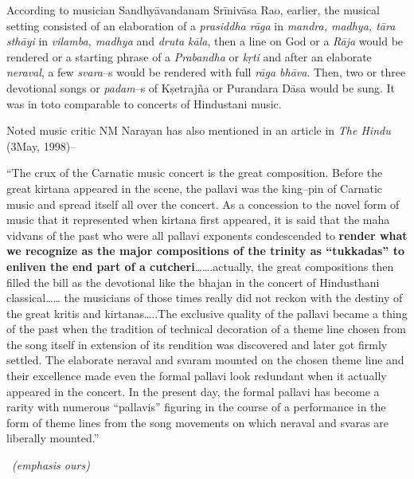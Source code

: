 According to musician Sandhyāvandanam Srīnivāsa Rao, earlier, the musical setting consisted of an elaboration of a \textit{prasiddha rāga} in \textit{mandra, madhya, tāra sthāyi} in \textit{vilamba, madhya} and \textit{druta kāla}, then a line on God or a \textit{Rāja} would be rendered or a starting phrase of a \textit{Prabandha} or \textit{kṛti} and after an elaborate \textit{neraval}, a few \textit{svara}–s would be rendered with full \textit{rāga bhāva}. Then, two or three devotional songs or \textit{padam}–s of Kṣetrajña or Purandara Dāsa would be sung. It was in toto comparable to concerts of Hindustani music.

Noted music critic NM Narayan has also mentioned in an article in \textit{The Hindu} (3May, 1998)–

\begin{myquote}
“The crux of the Carnatic music concert is the great composition. Before the great kirtana appeared in the scene, the pallavi was the king–pin of Carnatic music and spread itself all over the concert. As a concession to the novel form of music that it represented when kirtana first appeared, it is said that the maha vidvans of the past who were all pallavi exponents condescended to \textbf{render what we recognize as the major compositions of the trinity as “tukkadas” to enliven the end part of a cutcheri}…….actually, the great compositions then filled the bill as the devotional like the bhajan in the concert of Hindusthani classical…… the musicians of those times really did not reckon with the destiny of the great kritis and kirtanas…..The exclusive quality of the pallavi became a thing of the past when the tradition of technical decoration of a theme line chosen from the song itself in extension of its rendition was discovered and later got firmly settled. The elaborate neraval and svaram mounted on the chosen theme line and their excellence made even the formal pallavi look redundant when it actually appeared in the concert. In the present day, the formal pallavi has become a rarity with numerous “pallavis” figuring in the course of a performance in the form of theme lines from the song movements on which neraval and svaras are liberally mounted.”
\end{myquote}

\vspace{-.3cm}

\begin{myquote}

~\hfill \textit{(emphasis ours)}
\end{myquote}

